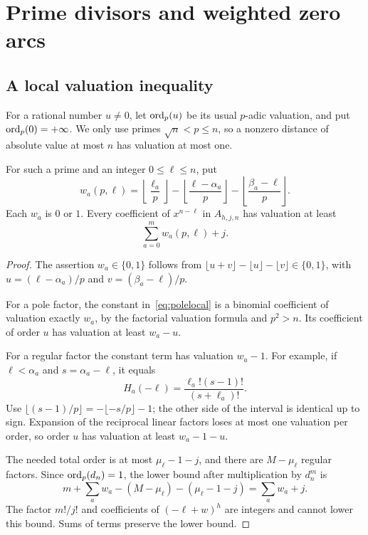 \section{Prime divisors and weighted zero arcs}
\label{sec:arithmetic}

\subsection{A local valuation inequality}

For a rational number \(u\ne0\), let \(\operatorname{ord}_p(u)\) be its usual
\(p\)-adic valuation, and put \(\operatorname{ord}_p(0)=+\infty\).
We only use primes \(\sqrt n<p\le n\), so a nonzero distance of
absolute value at most \(n\) has valuation at most one.

\begin{lemma}\label{lem:valuation}
For such a prime and an integer \(0\le\ell\le n\), put
\[
w_a(p,\ell)=
\left\lfloor\frac{\ell_a}{p}\right\rfloor
-\left\lfloor\frac{\ell-\alpha_a}{p}\right\rfloor
-\left\lfloor\frac{\beta_a-\ell}{p}\right\rfloor.
\]
Each \(w_a\) is \(0\) or \(1\). Every coefficient of \(x^{n-\ell}\)
in \(A_{h,j,n}\) has valuation at least
\begin{equation}\label{eq:valbound}
\sum_{a=0}^{m}w_a(p,\ell)+j.
\end{equation}
\end{lemma}
\begin{proof}
The assertion \(w_a\in\{0,1\}\) follows from
\(\lfloor u+v\rfloor-\lfloor u\rfloor-\lfloor v\rfloor\in\{0,1\}\),
with \(u=(\ell-\alpha_a)/p\) and \(v=(\beta_a-\ell)/p\).

For a pole factor, the constant in~\eqref{eq:polelocal} is a binomial
coefficient of valuation exactly \(w_a\), by the factorial valuation
formula and \(p^2>n\). Its coefficient of order \(u\) has valuation
at least \(w_a-u\).

For a regular factor the constant term has valuation \(w_a-1\).
For example, if \(\ell<\alpha_a\) and \(s=\alpha_a-\ell\), it equals
\[
H_a(-\ell)=\frac{\ell_a!(s-1)!}{(s+\ell_a)!}.
\]
Use
\(\lfloor(s-1)/p\rfloor=-\lfloor-s/p\rfloor-1\);
the other side of the interval is identical up to sign.
Expansion of the reciprocal linear factors loses at most one
valuation per order, so order \(u\) has valuation at least
\(w_a-1-u\).

The needed total order is at most \(\mu_\ell-1-j\), and there are
\(M-\mu_\ell\) regular factors. Since
\(\operatorname{ord}_p(d_n)=1\), the lower bound after multiplication by \(d_n^m\)
is
\[
m+\sum_aw_a-(M-\mu_\ell)-(\mu_\ell-1-j)
=\sum_aw_a+j.
\]
The factor \(m!/j!\) and coefficients of \((-\ell+w)^h\) are integers
and cannot lower this bound. Sums of terms preserve the lower bound.
\end{proof}

